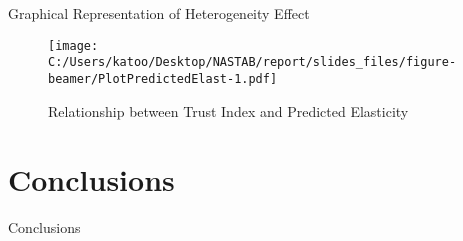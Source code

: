 \documentclass[
  ignorenonframetext,
]{beamer}
\begin{document}
\begin{frame}{Graphical Representation of Heterogeneity Effect}
\protect\hypertarget{graphical-representation-of-heterogeneity-effect}{}
\begin{figure}
\centering
\texttt{[image: C:/Users/katoo/Desktop/NASTAB/report/slides\_files/figure-beamer/PlotPredictedElast-1.pdf]}
\caption{Relationship between Trust Index and Predicted Elasticity}
\end{figure}
\end{frame}

\hypertarget{conclusions}{%
\section{Conclusions}\label{conclusions}}

\begin{frame}{Conclusions}
\protect\hypertarget{conclusions-1}{}
\end{frame}
\end{document}
